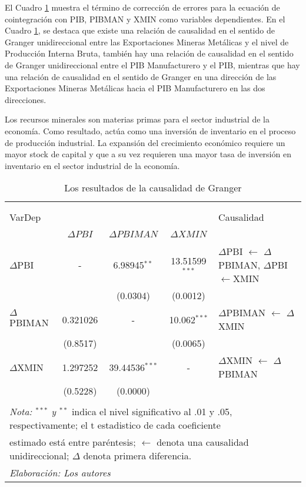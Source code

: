 \documentclass[11pt,]{article}
\begin{document}
El Cuadro \ref{tab:tb7} muestra el término de corrección de errores para
la ecuación de cointegración con PIB, PIBMAN y XMIN como variables
dependientes. En el Cuadro \ref{tab:tb7}, se destaca que existe una
relación de causalidad en el sentido de Granger unidireccional entre las
Exportaciones Mineras Metálicas y el nivel de Producción Interna Bruta,
también hay una relación de causalidad en el sentido de Granger
unidireccional entre el PIB Manufacturero y el PIB, mientras que hay una
relación de causalidad en el sentido de Granger en una dirección de las
Exportaciones Mineras Metálicas hacia el PIB Manufacturero en las dos
direcciones.

Los recursos minerales son materias primas para el sector industrial de
la economía. Como resultado, actúa como una inversión de inventario en
el proceso de producción industrial. La expansión del crecimiento
económico requiere un mayor stock de capital y que a su vez requieren
una mayor tasa de inversión en inventario en el sector industrial de la
economía.

\begin{table}[!htbp] \centering 
  \caption{Los resultados de la causalidad de Granger} 
  \label{tab:tb7} 
\small 
\begin{tabular}{@{\extracolsep{5pt}} lcccl} 
\\[-1.8ex]\hline 
\hline \\[-1.8ex] 
\\[-1.8ex] VarDep &   &  &  &Causalidad\\
\\[-1.8ex] & $\Delta PBI$  &  $\Delta PBIMAN$ & $\Delta XMIN$ &\\
\hline \\[-1.8ex] 
$\Delta$PBI & - & 6.98945$^{**}$ & 13.51599$^{***}$ & $\Delta$PBI $\leftarrow$ $\Delta$PBIMAN, $\Delta$PBI $\leftarrow$XMIN \\ 
 &  & (0.0304) & (0.0012) &  \\ 
$\Delta$PBIMAN & 0.321026 & - & 10.062$^{***}$ & $\Delta$PBIMAN $\leftarrow$ $\Delta$XMIN \\ 
 & (0.8517) &  & (0.0065) &  \\ 
$\Delta$XMIN & 1.297252 & 39.44536$^{***}$ & - & $\Delta$XMIN $\leftarrow$ $\Delta$PBIMAN \\ 
 & (0.5228) & (0.0000) &  &  \\ 
\hline \\[-1.8ex] 
\multicolumn{5}{l}{\footnotesize{\textit{Nota: $^{***}$ y $^{**}$} indica el nivel significativo al .01 y .05, respectivamente; el t estadistico de cada coeficiente}} \\ 
\multicolumn{5}{l}{\footnotesize{ estimado está entre paréntesis; $\leftarrow$ denota una causalidad unidireccional; $\Delta$ denota primera diferencia.}} \\ 
\multicolumn{5}{l}{\footnotesize{\textit{Elaboración: Los autores}}} \\ 
\end{tabular} 
\end{table}
\end{document}
